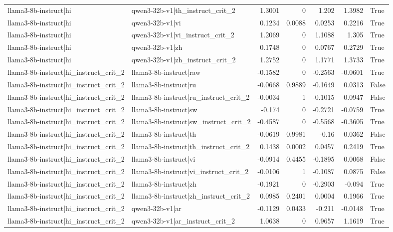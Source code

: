 \begin{table}
\begin{tabular}{l l r r r r l}
llama3-8b-instruct|hi & qwen3-32b-v1|th_instruct_crit_2 & 1.3001 & 0 & 1.202 & 1.3982 & True \\
llama3-8b-instruct|hi & qwen3-32b-v1|vi & 0.1234 & 0.0088 & 0.0253 & 0.2216 & True \\
llama3-8b-instruct|hi & qwen3-32b-v1|vi_instruct_crit_2 & 1.2069 & 0 & 1.1088 & 1.305 & True \\
llama3-8b-instruct|hi & qwen3-32b-v1|zh & 0.1748 & 0 & 0.0767 & 0.2729 & True \\
llama3-8b-instruct|hi & qwen3-32b-v1|zh_instruct_crit_2 & 1.2752 & 0 & 1.1771 & 1.3733 & True \\
llama3-8b-instruct|hi_instruct_crit_2 & llama3-8b-instruct|raw & -0.1582 & 0 & -0.2563 & -0.0601 & True \\
llama3-8b-instruct|hi_instruct_crit_2 & llama3-8b-instruct|ru & -0.0668 & 0.9889 & -0.1649 & 0.0313 & False \\
llama3-8b-instruct|hi_instruct_crit_2 & llama3-8b-instruct|ru_instruct_crit_2 & -0.0034 & 1 & -0.1015 & 0.0947 & False \\
llama3-8b-instruct|hi_instruct_crit_2 & llama3-8b-instruct|sw & -0.174 & 0 & -0.2721 & -0.0759 & True \\
llama3-8b-instruct|hi_instruct_crit_2 & llama3-8b-instruct|sw_instruct_crit_2 & -0.4587 & 0 & -0.5568 & -0.3605 & True \\
llama3-8b-instruct|hi_instruct_crit_2 & llama3-8b-instruct|th & -0.0619 & 0.9981 & -0.16 & 0.0362 & False \\
llama3-8b-instruct|hi_instruct_crit_2 & llama3-8b-instruct|th_instruct_crit_2 & 0.1438 & 0.0002 & 0.0457 & 0.2419 & True \\
llama3-8b-instruct|hi_instruct_crit_2 & llama3-8b-instruct|vi & -0.0914 & 0.4455 & -0.1895 & 0.0068 & False \\
llama3-8b-instruct|hi_instruct_crit_2 & llama3-8b-instruct|vi_instruct_crit_2 & -0.0106 & 1 & -0.1087 & 0.0875 & False \\
llama3-8b-instruct|hi_instruct_crit_2 & llama3-8b-instruct|zh & -0.1921 & 0 & -0.2903 & -0.094 & True \\
llama3-8b-instruct|hi_instruct_crit_2 & llama3-8b-instruct|zh_instruct_crit_2 & 0.0985 & 0.2401 & 0.0004 & 0.1966 & True \\
llama3-8b-instruct|hi_instruct_crit_2 & qwen3-32b-v1|ar & -0.1129 & 0.0433 & -0.211 & -0.0148 & True \\
llama3-8b-instruct|hi_instruct_crit_2 & qwen3-32b-v1|ar_instruct_crit_2 & 1.0638 & 0 & 0.9657 & 1.1619 & True \\

\end{tabular}
\end{table}
